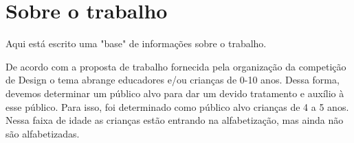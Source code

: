 \documentclass{sigchi}
\begin{document}
\title{\plaintitle}

\author{%
  \\
  \\
  \\  
  \\
  \\  
}

\maketitle



\section{Sobre o trabalho}

Aqui está escrito uma "base" de informações sobre o trabalho.

De acordo com a proposta de trabalho fornecida pela organização da competição de Design o tema abrange educadores e/ou crianças de 0-10 anos. Dessa forma, devemos determinar um público alvo para dar um devido tratamento e auxílio à esse público. Para isso, foi determinado como público alvo crianças de 4 a 5 anos. Nessa faixa de idade as crianças estão entrando na alfabetização, mas ainda não são alfabetizadas. 
\end{document}

